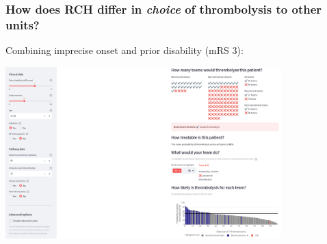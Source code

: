 \begin{frame}
\frametitle{\large{How does RCH differ in \textit{choice} of thrombolysis to other units?}}

\small
Combining imprecise onset and prior disability (mRS 3): 

\vspace{3mm}
\begin{center}

\includegraphics[width=0.80\textwidth]{./Truro/truro_mrs3_imprecise}

\small

    
\end{center}


\end{frame}